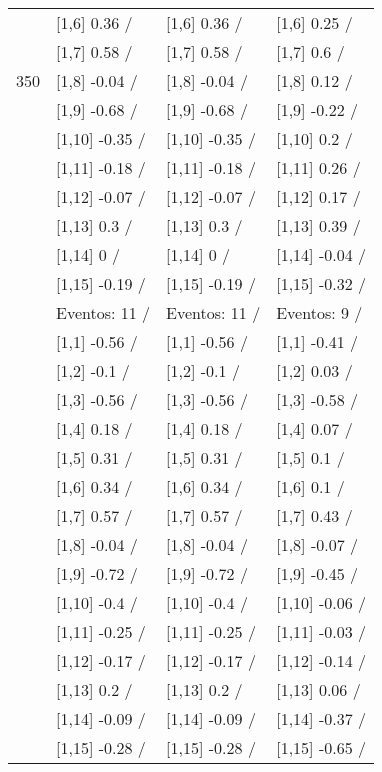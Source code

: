 \begin{table}
\begin{tabular}[t]{llll}
 & {}[1,6] 0.36  / & {}[1,6] 0.36  / & {}[1,6] 0.25  /\\
 & {}[1,7] 0.58  / & {}[1,7] 0.58  / & {}[1,7] 0.6  /\\
350 & {}[1,8] -0.04  / & {}[1,8] -0.04  / & {}[1,8] 0.12  /\\
\addlinespace
 & {}[1,9] -0.68  / & {}[1,9] -0.68  / & {}[1,9] -0.22  /\\
 & {}[1,10] -0.35  / & {}[1,10] -0.35  / & {}[1,10] 0.2  /\\
 & {}[1,11] -0.18  / & {}[1,11] -0.18  / & {}[1,11] 0.26  /\\
 & {}[1,12] -0.07  / & {}[1,12] -0.07  / & {}[1,12] 0.17  /\\
 & {}[1,13] 0.3  / & {}[1,13] 0.3  / & {}[1,13] 0.39  /\\
\addlinespace
 & {}[1,14] 0  / & {}[1,14] 0  / & {}[1,14] -0.04  /\\
 & {}[1,15] -0.19  / & {}[1,15] -0.19  / & {}[1,15] -0.32  /\\
 & Eventos:  11 / & Eventos:  11 / & Eventos:  9 /\\
 & {}[1,1] -0.56  / & {}[1,1] -0.56  / & {}[1,1] -0.41  /\\
 & {}[1,2] -0.1  / & {}[1,2] -0.1  / & {}[1,2] 0.03  /\\
\addlinespace
 & {}[1,3] -0.56  / & {}[1,3] -0.56  / & {}[1,3] -0.58  /\\
 & {}[1,4] 0.18  / & {}[1,4] 0.18  / & {}[1,4] 0.07  /\\
 & {}[1,5] 0.31  / & {}[1,5] 0.31  / & {}[1,5] 0.1  /\\
 & {}[1,6] 0.34  / & {}[1,6] 0.34  / & {}[1,6] 0.1  /\\
 & {}[1,7] 0.57  / & {}[1,7] 0.57  / & {}[1,7] 0.43  /\\
\addlinespace
500 & {}[1,8] -0.04  / & {}[1,8] -0.04  / & {}[1,8] -0.07  /\\
 & {}[1,9] -0.72  / & {}[1,9] -0.72  / & {}[1,9] -0.45  /\\
 & {}[1,10] -0.4  / & {}[1,10] -0.4  / & {}[1,10] -0.06  /\\
 & {}[1,11] -0.25  / & {}[1,11] -0.25  / & {}[1,11] -0.03  /\\
 & {}[1,12] -0.17  / & {}[1,12] -0.17  / & {}[1,12] -0.14  /\\
\addlinespace
 & {}[1,13] 0.2  / & {}[1,13] 0.2  / & {}[1,13] 0.06  /\\
 & {}[1,14] -0.09  / & {}[1,14] -0.09  / & {}[1,14] -0.37  /\\
 & {}[1,15] -0.28  / & {}[1,15] -0.28  / & {}[1,15] -0.65  /\\
\bottomrule
\end{tabular}
\end{table}
